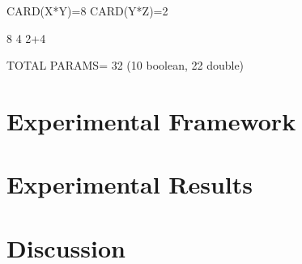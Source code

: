 CARD(X*Y)=8
CARD(Y*Z)=2

8
4
2+4	

TOTAL PARAMS= 32 (10 boolean, 22 double)

\section{Experimental Framework}
\label{sec:chp3-experimental}

\section{Experimental Results}
\label{sec:chp3-results}

\section{Discussion}
\label{sec:chp3-discussion}


